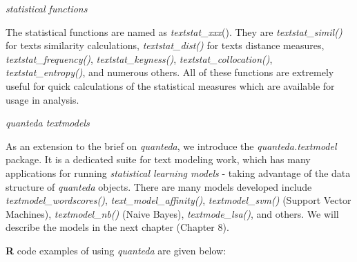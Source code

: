 \documentclass[
]{article}
\begin{document}
\emph{statistical functions}

The statistical functions are named as \emph{textstat\_xxx}(). They are \emph{textstat\_simil()} for texts similarity calculations, \emph{textstat\_dist()} for texts distance measures, \emph{textstat\_frequency()}, \emph{textstat\_keyness()}, \emph{textstat\_collocation()}, \emph{textstat\_entropy()}, and numerous others. All of these functions are extremely useful for quick calculations of the statistical measures which are available for usage in analysis.

\emph{quanteda textmodels}

As an extension to the brief on \emph{quanteda}, we introduce the \emph{quanteda.textmodel} package. It is a dedicated suite for text modeling work, which has many applications for running \emph{statistical learning models} - taking advantage of the data structure of \emph{quanteda} objects. There are many models developed include \emph{textmodel\_wordscores()}, \emph{text\_model\_affinity()}, \emph{textmodel\_svm()} (Support Vector Machines), \emph{textmodel\_nb()} (Naive Bayes), \emph{textmode\_lsa()}, and others. We will describe the models in the next chapter (Chapter 8).

\textbf{R} code examples of using \emph{quanteda} are given below:

\footnotesize
\end{document}
